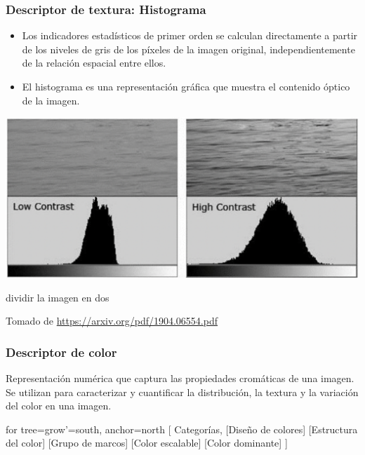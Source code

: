 \documentclass[
10pt, %
aspectratio=169, %
]{beamer}
\begin{document}
	\begin{frame}
		
		\frametitle{Descriptor de textura: Histograma}
		
		\begin{itemize}
			\item Los indicadores estadísticos de primer orden se calculan directamente a partir de los niveles de gris de los píxeles de la imagen original, independientemente de la relación espacial entre ellos. 
			
			\item El histograma es una representación gráfica que muestra el contenido óptico de la imagen.
			
		\end{itemize}
		
		\pause
		\vspace{2\baselineskip}
		
		\centering
		\includegraphics[scale=0.45]{textura.png} 
		
		dividir la imagen en dos
		
		{\scriptsize Tomado de \url{https://arxiv.org/pdf/1904.06554.pdf}}
		
	\end{frame}
	
	\begin{frame}
		
		\frametitle{Descriptor de color}
		
		\begin{alertblock}{}
			Representación numérica que captura las propiedades cromáticas de una imagen. Se utilizan para caracterizar y cuantificar la distribución, la textura y la variación del color en una imagen.
		\end{alertblock}
		
		\pause
		\vspace{2\baselineskip}
		\centering
		\begin{forest}
			for tree={grow'=south, anchor=north}
			[ Categorías, 
			[Diseño de colores]
			[Estructura del color]
			[Grupo de marcos]
			[Color escalable]
			[Color dominante] 
			]
		\end{forest}
		
		
	\end{frame}
	
\end{document}
